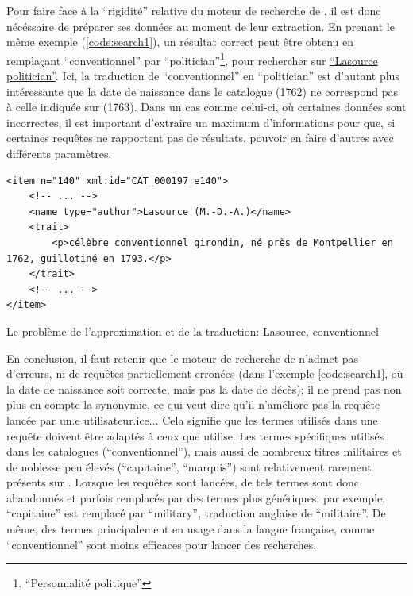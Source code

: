Pour faire face à la \enquote{rigidité} relative du moteur de recherche de \wkd{}, il est donc nécéssaire de préparer ses données au moment de leur extraction. En prenant le même exemple (\ref{code:search1}), un résultat correct peut être obtenu en remplaçant \enquote{conventionnel} par \enquote{politician}\footnote{\enquote{Personnalité politique}}, pour rechercher sur \wkd{} \href{https://www.wikidata.org/w/index.php?search=lasource+politician&search=lasource+politician&title=Special%3ASearch&go=Go&ns0=1&ns120=1}{\enquote{Lasource politician}}. Ici, la traduction de \enquote{conventionnel} en \enquote{politician} est d'autant plus intéressante que la date de naissance dans le catalogue (1762) ne correspond pas à celle indiquée sur \wkd{} (1763). Dans un cas comme celui-ci, où certaines données sont incorrectes, il est important d'extraire un maximum d'informations pour que, si certaines requêtes ne rapportent pas de résultats, pouvoir en faire d'autres avec différents paramètres.

\begin{listing}
	\begin{verbatim}
<item n="140" xml:id="CAT_000197_e140">
	<!-- ... -->
	<name type="author">Lasource (M.-D.-A.)</name>
	<trait>
		<p>célèbre conventionnel girondin, né près de Montpellier en 1762, guillotiné en 1793.</p>
	</trait>
	<!-- ... -->
</item>	
	\end{verbatim}
	\caption{Le problème de l'approximation et de la traduction: Lasource, conventionnel}
	\label{code:search1}
\end{listing}

En conclusion, il faut retenir que le moteur de recherche de \wkd{} n'admet pas d'erreurs, ni de requêtes partiellement erronées (dans l'exemple \ref{code:search1}, où la date de naissance soit correcte, mais pas la date de décès); il ne prend pas non plus en compte la synonymie, ce qui veut dire qu'il n'améliore pas la requête lancée par un.e utilisateur.ice... Cela signifie que les termes utilisés dans une requête doivent être adaptés à ceux que \wkd{} utilise. Les termes spécifiques utilisés dans les catalogues (\enquote{conventionnel}), mais aussi de nombreux titres militaires et de noblesse peu élevés (\enquote{capitaine}, \enquote{marquis}) sont relativement rarement présents sur \wkd{}. Lorsque les requêtes sont lancées, de tels termes sont donc abandonnés et parfois remplacés par des termes plus génériques: par exemple, \enquote{capitaine} est remplacé par \enquote{military}, traduction anglaise de \enquote{militaire}. De même, des termes principalement en usage dans la langue française, comme \enquote{conventionnel} sont moins efficaces pour lancer des recherches.

